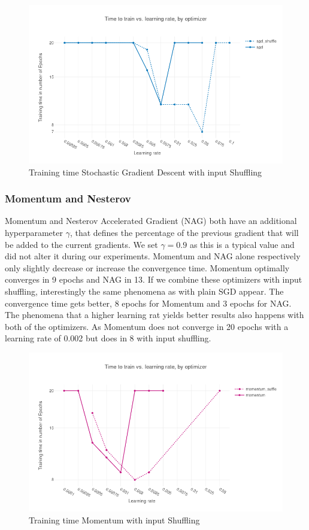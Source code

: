 \begin{figure}[h]
\centering
\includegraphics[scale=0.3]{images/results_sgd_shuffle}
\caption{Training time Stochastic Gradient Descent with input Shuffling}
\label{fig:results_sgd}
\end{figure}
\iffalse 
\subsubsection{Momentum and Nesterov}
Momentum and  Nesterov Accelerated Gradient (NAG) \citep{nag} both have an additional hyperparameter $\gamma$, that defines the percentage of the previous gradient that will be added to the current gradients. We set $\gamma = 0.9$ as this is a typical value and did not alter it during our experiments. Momentum and NAG alone respectively only slightly decrease or increase the convergence time. Momentum optimally converges in 9 epochs and NAG in 13. If we combine these optimizers with input shuffling, interestingly the same phenomena as with plain SGD appear. The convergence time gets better, 8 epochs for Momentum and 3 epochs for NAG. The phenomena that a higher learning rat yields better results also happens with both of the optimizers. As Momentum does not converge in 20 epochs with a learning rate of 0.002 but does in 8 with input shuffling.
\begin{figure}[h]
\centering

\includegraphics[scale=0.3]{images/results_mom_shuffle}
\caption{Training time Momentum with input Shuffling}
\label{fig:results_mom}
\end{figure}

